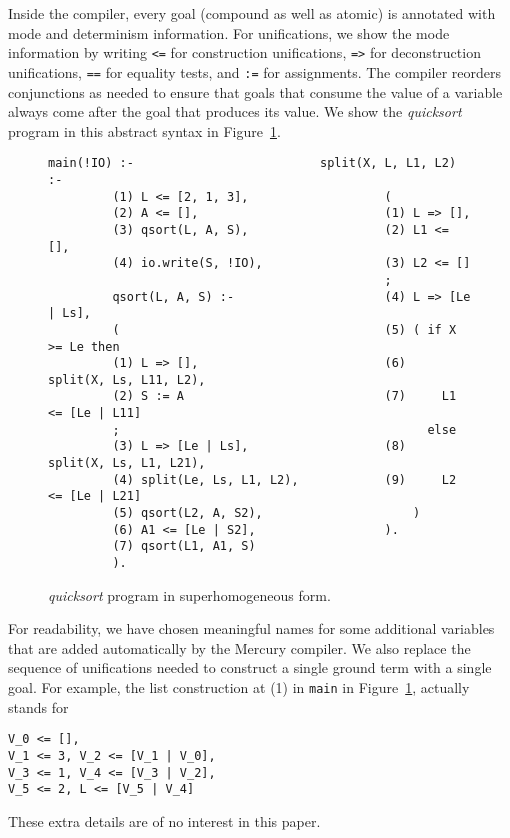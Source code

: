 \documentclass{tlp}
\newcommand{\code}[1]{{\tt#1}}
\begin{document}
Inside the compiler, every goal (compound as well as atomic)
is annotated with mode and determinism information.
For unifications, we show the mode information by writing
\code{<=} for construction unifications,
\code{=>} for deconstruction unifications,
\code{==} for equality tests,
and \code{:=} for assignments.
The compiler reorders conjunctions as needed to ensure that
goals that consume the value of a variable
always come after the goal that produces its value.
We show the \emph{quicksort} program in this abstract syntax
in Figure~\ref{fig:running:superhomogeneous}.
\begin{figure}[htb]
\scriptsize
\begin{Verbatim}[frame=single,framerule=0.2pt,framesep=3pt]
         main(!IO) :-                          split(X, L, L1, L2) :-
         (1) L <= [2, 1, 3],                   (
         (2) A <= [],                          (1) L => [],
         (3) qsort(L, A, S),                   (2) L1 <= [],
         (4) io.write(S, !IO),                 (3) L2 <= []
                                               ;
         qsort(L, A, S) :-                     (4) L => [Le | Ls],
         (                                     (5) ( if X >= Le then
         (1) L => [],                          (6)     split(X, Ls, L11, L2),
         (2) S := A                            (7)     L1 <= [Le | L11]
         ;                                           else
         (3) L => [Le | Ls],                   (8)     split(X, Ls, L1, L21),
         (4) split(Le, Ls, L1, L2),            (9)     L2 <= [Le | L21]
         (5) qsort(L2, A, S2),                     )
         (6) A1 <= [Le | S2],                  ).
         (7) qsort(L1, A1, S)
         ).
\end{Verbatim}
\small
\caption{\emph{quicksort} program in superhomogeneous form.}
\normalsize
\label{fig:running:superhomogeneous}
\end{figure}
For readability, we have chosen meaningful names for some additional variables
that are added automatically by the Mercury compiler.
We also replace the sequence of unifications
needed to construct a single ground term
with a single goal.
For example, the list construction at (1) in \code{main}
in Figure~\ref{fig:running:superhomogeneous},
actually stands for
\begin{verbatim}
V_0 <= [],
V_1 <= 3, V_2 <= [V_1 | V_0],
V_3 <= 1, V_4 <= [V_3 | V_2],
V_5 <= 2, L <= [V_5 | V_4]
\end{verbatim}
These extra details are of no interest in this paper.
\end{document}
